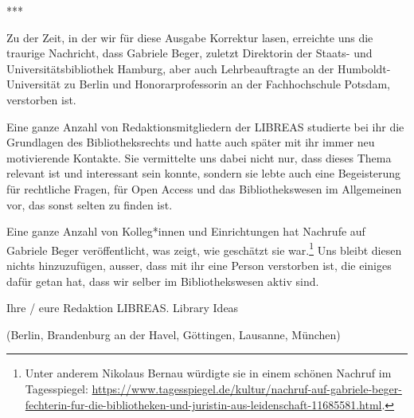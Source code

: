 \documentclass[a4paper,
fontsize=11pt,
oneside,
numbers=noperiodatend,
parskip=half-,
bibliography=totoc,
final
]{scrartcl}
\begin{document}
***

Zu der Zeit, in der wir für diese Ausgabe Korrektur lasen, erreichte uns
die traurige Nachricht, dass Gabriele Beger, zuletzt Direktorin der
Staats- und Universitätsbibliothek Hamburg, aber auch Lehrbeauftragte an
der Humboldt-Universität zu Berlin und Honorarprofessorin an der
Fachhochschule Potsdam, verstorben ist.

Eine ganze Anzahl von Redaktionsmitgliedern der LIBREAS studierte bei
ihr die Grundlagen des Bibliotheksrechts und hatte auch später mit ihr
immer neu motivierende Kontakte. Sie vermittelte uns dabei nicht nur,
dass dieses Thema relevant ist und interessant sein konnte, sondern sie
lebte auch eine Begeisterung für rechtliche Fragen, für Open Access und
das Bibliothekswesen im Allgemeinen vor, das sonst selten zu finden ist.

Eine ganze Anzahl von Kolleg*innen und Einrichtungen hat Nachrufe auf
Gabriele Beger veröffentlicht, was zeigt, wie geschätzt sie
war.\footnote{Unter anderem Nikolaus Bernau würdigte sie in einem
  schönen Nachruf im Tagesspiegel:
  \url{https://www.tagesspiegel.de/kultur/nachruf-auf-gabriele-beger-fechterin-fur-die-bibliotheken-und-juristin-aus-leidenschaft-11685581.html}.}
Uns bleibt diesen nichts hinzuzufügen, ausser, dass mit ihr eine Person
verstorben ist, die einiges dafür getan hat, dass wir selber im
Bibliothekswesen aktiv sind.

Ihre / eure Redaktion LIBREAS. Library Ideas

(Berlin, Brandenburg an der Havel, Göttingen, Lausanne, München)

\end{document}
